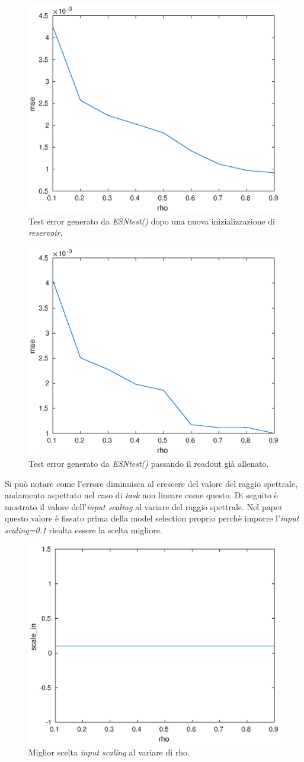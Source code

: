 \begin{figure}[H]
	\centering 
	\includegraphics[width=0.6\linewidth]{immagini/testnewtrain}
	\caption{Test error generato da \textit{ESNtest()} dopo una nuova inizializzazione di \textit{reservoir}.}
	\label{fig:testnewtrain}
\end{figure}
\begin{figure}[H]
	\centering 
	\includegraphics[width=0.6\linewidth]{immagini/testwout}
	\caption{Test error generato da \textit{ESNtest()} passando il readout già allenato.}
	\label{fig:testwout}
\end{figure}
Si può notare come l'errore diminuisca al crescere del valore del raggio spettrale, andamento aspettato nel caso di \textit{task} non lineare come questo.
Di seguito è mostrato il valore dell'\textit{input scaling} al variare del raggio spettrale. Nel paper questo valore è fissato prima della model selection proprio perchè imporre l'\textit{input scaling=0.1} risulta essere la scelta migliore.
\begin{figure}[H]
	\centering 
	\includegraphics[width=0.6\linewidth]{immagini/scalein}
	\caption{Miglior scelta \textit{input scaling} al variare di rho.}
	\label{fig:scalein}
\end{figure}


